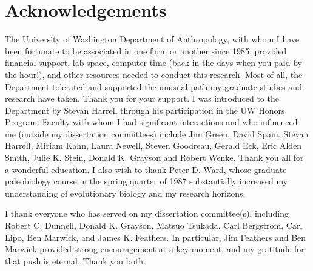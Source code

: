 





\renewcommand{\cftchapterfont}{\normalsize\normalfont}   
\renewcommand{\cftpartfont}{\normalsize\normalfont}   
\renewcommand{\cftsectionfont}{\normalsize\normalfont} 
\renewcommand{\cftsubsectionfont}{\normalsize\normalfont} 
\renewcommand*{\cftpartname}{Part\space}
\newpage
\setcounter{tocdepth}{3} 
\tableofcontents*
\cleardoublepage
\listoffigures
\cleardoublepage
\listoftables
\cleardoublepage



\clearpage
\chapter{Acknowledgements}

The University of Washington Department of Anthropology, with whom I have been fortunate to be associated in one form or another since 1985, provided financial support, lab space, computer time (back in the days when you paid by the hour!), and other resources needed to conduct this research.  Most of all, the Department tolerated and supported the unusual path my graduate studies and research have taken.  Thank you for your support.  I was introduced to the Department by Stevan Harrell through his participation in the UW Honors Program.  Faculty with whom I had significant interactions and who influenced me (outside my dissertation committees) include Jim Green, David Spain, Stevan Harrell, Miriam Kahn, Laura Newell, Steven Goodreau, Gerald Eck, Eric Alden Smith, Julie K. Stein, Donald K. Grayson and Robert Wenke.  Thank you all for a wonderful education.  I also wish to thank Peter D. Ward, whose graduate paleobiology course in the spring quarter of 1987 substantially increased my understanding of evolutionary biology and my research horizons.  

\vskip 0.3cm

I thank everyone who has served on my dissertation committee(s), including Robert C. Dunnell, Donald K. Grayson, Matsuo Tsukada, Carl Bergstrom, Carl Lipo, Ben Marwick, and James K. Feathers.  In particular, Jim Feathers and Ben Marwick provided strong encouragement at a key moment, and my gratitude for that push is eternal.  Thank you both. 

